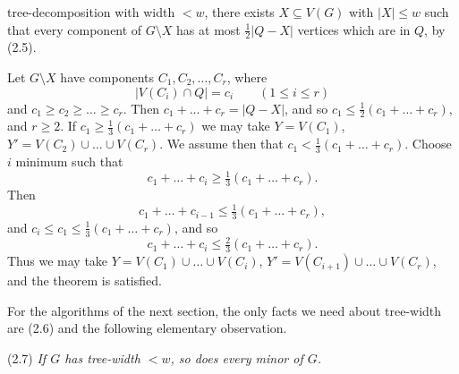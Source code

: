 \noindent tree-decomposition with width $< w$, there exists $X \subseteq V(G)$ with $|X| \le w$ such that every component of $G \setminus X$ has at most $\tfrac{1}{2} |Q - X|$ vertices which are in $Q$, by (2.5).

Let $G \setminus X$ have components $C_1, C_2, \dots, C_r$, where
\begin{equation*}
|V(C_i) \cap Q| = c_i \qquad (1 \le i \le r)
\end{equation*}
and $c_1 \ge c_2 \ge \dots \ge c_r$. Then $c_1 + \dots + c_r = |Q - X|$, and so $c_1 \le \tfrac{1}{2}(c_1 + \dots + c_r)$, and $r \ge 2$. If $c_1 \ge \tfrac{1}{3}(c_1 + \dots + c_r)$ we may take $Y = V(C_1)$, $Y' = V(C_2) \cup \dots \cup V(C_r)$. We assume then that $c_1 < \tfrac{1}{3}(c_1 + \dots + c_r)$. Choose $i$ minimum such that
\begin{equation*}
c_1 + \dots + c_i \ge \tfrac{1}{3}(c_1 + \dots + c_r).
\end{equation*}
Then
\begin{equation*}
c_1 + \dots + c_{i-1} \le \tfrac{1}{3}(c_1 + \dots + c_r),
\end{equation*}
and $c_i \le c_1 \le \tfrac{1}{3}(c_1 + \dots + c_r)$, and so
\begin{equation*}
c_1 + \dots + c_i \le \tfrac{2}{3}(c_1 + \dots + c_r).
\end{equation*}
Thus we may take $Y = V(C_1) \cup \dots \cup V(C_i)$, $Y' = V(C_{i+1}) \cup \dots \cup V(C_r)$, and the theorem is satisfied.

For the algorithms of the next section, the only facts we need about tree-width are (2.6) and the following elementary observation.

\stmt
(2.7) \textit{If $G$ has tree-width $< w$, so does every minor of $G$.}

